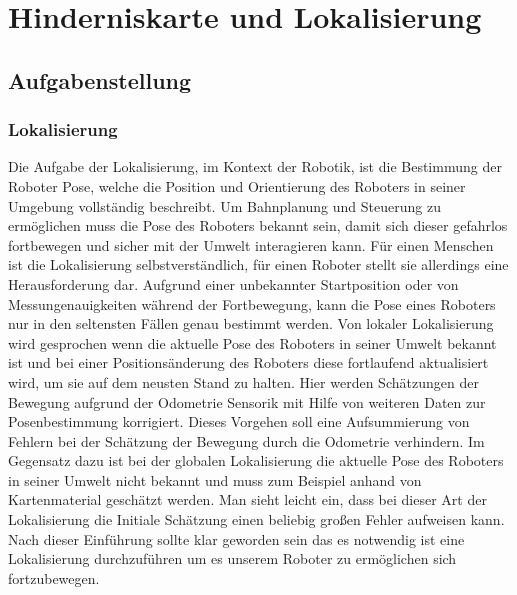 \chapter{Hinderniskarte und Lokalisierung}
\label{lokalisierung_cha}
\section{Aufgabenstellung}
\label{lokalisierung_aufgabenstellung_sec}
\authorsection{\editorandreas}
\subsection{Lokalisierung}
Die Aufgabe der Lokalisierung, im Kontext der Robotik, ist die Bestimmung der
Roboter Pose, welche die Position und Orientierung des Roboters in seiner Umgebung vollständig beschreibt.
 Um Bahnplanung und Steuerung zu ermöglichen muss die Pose des Roboters bekannt sein,
 damit sich dieser gefahrlos fortbewegen und sicher mit der Umwelt interagieren kann.
 Für einen Menschen ist die Lokalisierung selbstverständlich, für einen Roboter
 stellt sie allerdings eine Herausforderung dar.
 Aufgrund einer unbekannter Startposition oder von Messungenauigkeiten während
 der Fortbewegung, kann die Pose eines Roboters nur in den seltensten Fällen
 genau bestimmt werden.
 Von lokaler Lokalisierung wird gesprochen wenn die aktuelle Pose des Roboters
 in seiner Umwelt bekannt ist und bei einer Positionsänderung des Roboters diese
 fortlaufend aktualisiert wird, um sie auf dem neusten Stand zu halten. Hier
 werden Schätzungen der Bewegung aufgrund der Odometrie Sensorik mit Hilfe von weiteren Daten zur Posenbestimmung korrigiert. Dieses Vorgehen soll eine Aufsummierung von Fehlern bei der
 Schätzung der Bewegung durch die Odometrie verhindern. Im Gegensatz dazu ist
 bei der globalen Lokalisierung die aktuelle Pose des Roboters in seiner Umwelt
 nicht bekannt und muss zum Beispiel anhand von Kartenmaterial geschätzt werden.
 Man sieht leicht ein, dass bei dieser Art der Lokalisierung die Initiale
 Schätzung einen beliebig großen Fehler aufweisen kann.
 Nach dieser Einführung sollte klar geworden sein das es notwendig
 ist eine Lokalisierung durchzuführen um es unserem Roboter zu
 ermöglichen sich fortzubewegen.
